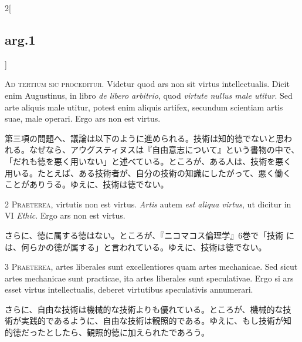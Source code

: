 \documentclass[paper=a4paper,fontsize=10pt,jafontsize=9pt,titlepage]{jlreq}
\begin{document}
\begin{paracol}{2}[\subsection{arg.1}]

{\huge A}{\scshape d tertium sic proceditur}. Videtur quod ars non sit
 virtus intellectualis. Dicit enim Augustinus, in libro {\itshape de
 libero arbitrio}, quod {\itshape virtute nullus male utitur}. Sed
 arte aliquis male utitur, potest enim aliquis artifex, secundum
 scientiam artis suae, male operari. Ergo ars non est virtus.

\switchcolumn

第三項の問題へ、議論は以下のように進められる。技術は知的徳でないと思わ
れる。なぜなら、アウグスティヌスは『自由意志について』という書物の中で、
「だれも徳を悪く用いない」と述べている。ところが、ある人は、技術を悪く
用いる。たとえば、ある技術者が、自分の技術の知識にしたがって、悪く働く
ことがありうる。ゆえに、技術は徳でない。


{\scshape 2 Praeterea}, virtutis non est virtus. {\itshape Artis}
autem {\itshape est aliqua virtus}, ut dicitur in VI {\itshape
Ethic}. Ergo ars non est virtus.

\switchcolumn

さらに、徳に属する徳はない。ところが、『ニコマコス倫理学』6巻で「技術
には、何らかの徳が属する」と言われている。ゆえに、技術は徳でない。


{\scshape 3 Praeterea}, artes liberales sunt excellentiores quam artes
mechanicae. Sed sicut artes mechanicae sunt practicae, ita artes
liberales sunt speculativae. Ergo si ars esset virtus intellectualis,
deberet virtutibus speculativis annumerari.

\switchcolumn

さらに、自由な技術は機械的な技術よりも優れている。ところが、機械的な技
術が実践的であるように、自由な技術は観照的である。ゆえに、もし技術が知
的徳だったとしたら、観照的徳に加えられたであろう。

\switchcolumn*[\subsection{s.c.}]


\end{paracol}
\end{document}
